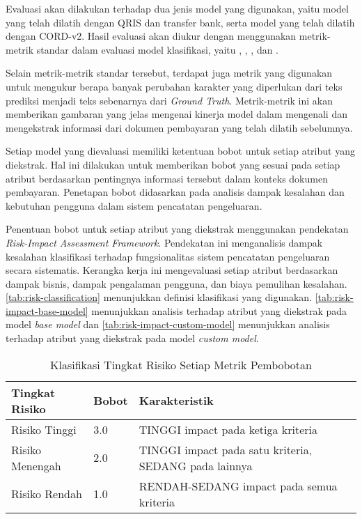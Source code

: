 Evaluasi akan dilakukan terhadap dua jenis model yang digunakan, yaitu model \donut{} yang telah dilatih dengan \dataset{} QRIS dan transfer bank, serta model \donut{} yang telah dilatih dengan \dataset{} CORD-v2. Hasil evaluasi akan diukur dengan menggunakan metrik-metrik standar dalam evaluasi model klasifikasi, yaitu \accuracy, \precision, \recall, dan \fscore. 

Selain metrik-metrik standar tersebut, terdapat juga metrik \mcer{} yang digunakan untuk mengukur berapa banyak perubahan karakter yang diperlukan dari teks prediksi menjadi teks sebenarnya dari \emph{Ground Truth}. Metrik-metrik ini akan memberikan gambaran yang jelas mengenai kinerja model dalam mengenali dan mengekstrak informasi dari dokumen pembayaran yang telah dilatih sebelumnya.

Setiap model yang dievaluasi memiliki ketentuan bobot untuk setiap atribut yang diekstrak. Hal ini dilakukan untuk memberikan bobot yang sesuai pada setiap atribut berdasarkan pentingnya informasi tersebut dalam konteks dokumen pembayaran. Penetapan bobot didasarkan pada analisis dampak kesalahan dan kebutuhan pengguna dalam sistem pencatatan pengeluaran.

Penentuan bobot untuk setiap atribut yang diekstrak menggunakan pendekatan \emph{Risk-Impact Assessment Framework}. Pendekatan ini menganalisis dampak kesalahan klasifikasi terhadap fungsionalitas sistem pencatatan pengeluaran secara sistematis. Kerangka kerja ini mengevaluasi setiap atribut berdasarkan dampak bisnis, dampak pengalaman pengguna, dan biaya pemulihan kesalahan. \autoref{tab:risk-classification} menunjukkan definisi klasifikasi yang digunakan. \autoref{tab:risk-impact-base-model} menunjukkan analisis terhadap atribut yang diekstrak pada model \emph{base model} dan \autoref{tab:risk-impact-custom-model} menunjukkan analisis terhadap atribut yang diekstrak pada model \emph{custom model}.

\begin{table}[h!]
    \centering
    \caption{Klasifikasi Tingkat Risiko Setiap Metrik Pembobotan}
    \label{tab:risk-classification}
    \begin{tabularx}{\textwidth}{|p{3cm}|p{1.5cm}|X|}
        \hline
        \textbf{Tingkat Risiko} & \textbf{Bobot} & \textbf{Karakteristik} \\ \hline
        Risiko Tinggi & 3.0 & TINGGI \newline  impact pada ketiga kriteria \\ \hline
        Risiko Menengah & 2.0 & TINGGI \newline  impact pada satu kriteria, SEDANG pada lainnya \\ \hline
        Risiko Rendah & 1.0 & RENDAH-SEDANG impact pada semua kriteria \\ \hline
    \end{tabularx}
\end{table}

